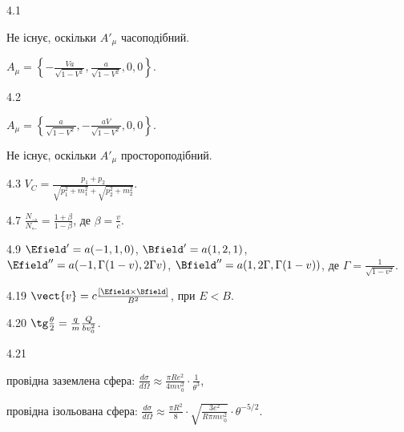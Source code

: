 \protect \section *{}
\begin{Solution}{4.{1}}
	\begin{enumerate*}[label=\alph*)]
		\item Не існує, оскільки $A'_{\mu}$ часоподібний.
		\item $A_{\mu} = \left\lbrace -\frac{Va}{\sqrt{1-V^2}},\frac{a}{\sqrt{1-V^2}},0,0 \right\rbrace$.
	\end{enumerate*}
\end{Solution}
\begin{Solution}{4.{2}}
	\begin{enumerate*}[label=\alph*)]
		\item $A_{\mu} = \left\lbrace \frac{a}{\sqrt{1-V^2}},-\frac{aV}{\sqrt{1-V^2}},0,0 \right\rbrace$.
		\item Не існує, оскільки $A'_{\mu}$ простороподібний.
	\end{enumerate*}
\end{Solution}
\begin{Solution}{4.{3}}
	$V_C = \frac{p_1 + p_2}{\sqrt{p_1^2 + m_1^2} + \sqrt{p_2^2 + m_2^2}}$.
\end{Solution}
\begin{Solution}{4.{7}}
	$\frac{N_\rightarrow}{N_\leftarrow} = \frac{1+ \beta}{1-\beta}$, де $\beta = \frac{v}{c}$.
\end{Solution}
\begin{Solution}{4.{9}}
	$\Efield' = a(-1,1,0)$, $\Bfield' = a(1,2,1)$, $\Efield'' = a(-1,\Gamma(1- v),2\Gamma v)$, $\Bfield'' = a(1,2\Gamma,\Gamma(1- v))$, де $\Gamma = \frac{1}{\sqrt{1 - v^2}}$.
\end{Solution}
\begin{Solution}{4.{19}}
	$\vect{v} = c \frac{\left[ \Efield\times\Bfield\right] }{B^2}$, при $E<B$.
\end{Solution}
\begin{Solution}{4.{20}}
	$\tg\frac{\theta}{2} = \frac qm \frac{Q}{bv_0^2}$.
\end{Solution}
\begin{Solution}{4.{21}}
	\begin{enumerate*}[label=\alph*)]
		\item провідна заземлена сфера: $\frac{d\sigma}{d\Omega} \approx \frac{\pi Re^2}{4mυ_0^2} \cdot \frac{1}{\theta ^3}$,
		\item провідна ізольована сфера: $\frac{d\sigma}{d\Omega} \approx \frac{\pi R^2}{8} \cdot \sqrt {\frac{3e^2}{R\pi mυ_0^2}}\cdot\theta^{-5/2}$.
	\end{enumerate*}
\end{Solution}
